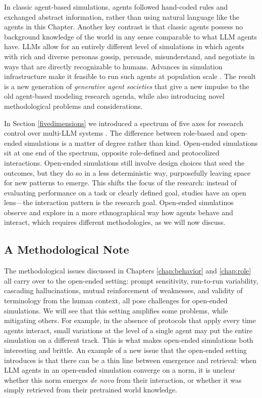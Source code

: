 In classic agent-based simulations, agents followed hand-coded rules and  exchanged abstract information, rather than using natural language like the agents in this Chapter. Another key contrast is that classic agents possess no background knowledge of the world in any sense comparable to what LLM agents have. %
LLMs allow for an entirely different level of simulations in which agents with rich and diverse personas gossip, persuade, misunderstand, and negotiate in ways that are directly recognizable to humans. Advances in simulation infrastructure make it feasible to run such agents at population scale \citep{gao2024large, yang2024oasis}. The result is a new generation of \emph{generative agent societies} that give a  new impulse to the old agent-based modeling research agenda, while also introducing novel methodological problems and considerations.

In Section \ref{fivedimensions} we introduced a spectrum of five axes for research control over multi-LLM systems  \citep{tran2025multi}. The difference between role-based and open-ended simulations is a matter of degree rather than kind. Open-ended simulations sit at one end of the spectrum, opposite role-defined and protocolized interactions. Open-ended simulations still involve design choices that seed the outcomes, but they do so in a less deterministic way, purposefully leaving space for new patterns to emerge. This shifts the focus of the research: instead of evaluating performance on a task or  clearly defined goal, studies have an open lens---the interaction pattern is the research goal. Open-ended simulatinos observe and explore in a more ethnographical way how agents behave and interact, which requires different methodologies, as we will now discuss.

\subsection{A Methodological Note} \label{sec:meth-emergent}
The methodological issues discussed in Chapters \ref{chap:behavior} and \ref{chap:role} all carry over to the open-ended setting: prompt sensitivity, run-to-run variability, cascading hallucinations, mutual reinforcement of weaknesses, and validity of terminology from the human context, all pose challenges for open-ended simulations. We will see that this setting amplifies some problems, while mitigating others. For example, in the absence of protocols that apply every time agents interact, small variations at the level of a single agent may put the entire simulation on a different track. This is what makes open-ended simulations both interesting and brittle. An example of a new issue that the open-ended setting introduces is that there can be a thin line between emergence and retrieval: when LLM agents in an open-ended simulation converge on a norm, it is unclear whether this norm emerges \emph{de novo} from their interaction, or whether it was simply retrieved from their pretrained world knowledge. 


